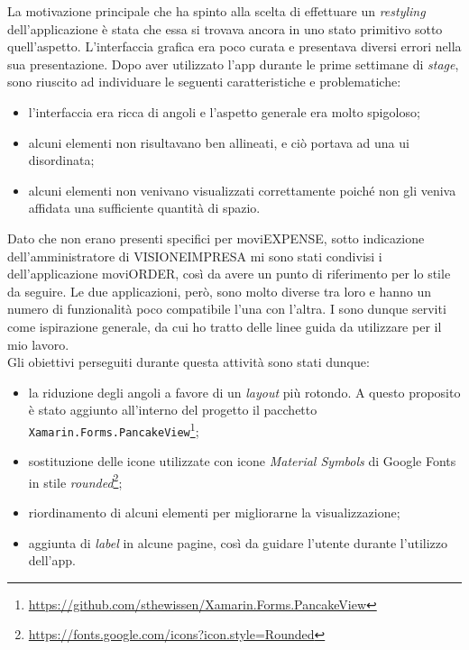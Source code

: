 La motivazione principale che ha spinto alla scelta di effettuare un \textit{restyling} dell'applicazione è stata che essa si trovava ancora in uno stato primitivo sotto quell'aspetto. L'interfaccia grafica era poco curata e presentava diversi errori nella sua presentazione. Dopo aver utilizzato l'app durante le prime settimane di \textit{stage}, sono riuscito ad individuare le seguenti caratteristiche e problematiche:
\begin{itemize}
    \item l'interfaccia era ricca di angoli e l'aspetto generale era molto spigoloso;
    \item alcuni elementi non risultavano ben allineati, e ciò portava ad una \acrshort{ui} disordinata;
    \item alcuni elementi non venivano visualizzati correttamente poiché non gli veniva affidata una sufficiente quantità di spazio.
\end{itemize}

\noindent Dato che non erano presenti  specifici per moviEXPENSE, sotto indicazione dell'amministratore di VISIONEIMPRESA mi sono stati condivisi i  dell'applicazione moviORDER, così da avere un punto di riferimento per lo stile da seguire. Le due applicazioni, però, sono molto diverse tra loro e hanno un numero di funzionalità poco compatibile l'una con l'altra. I  sono dunque serviti come ispirazione generale, da cui ho tratto delle linee guida da utilizzare per il mio lavoro.\\
Gli obiettivi perseguiti durante questa attività sono stati dunque:
\begin{itemize}
    \item la riduzione degli angoli a favore di un \textit{layout} più rotondo. A questo proposito è stato aggiunto all'interno del progetto il pacchetto \texttt{Xamarin.Forms.PancakeView}\footnote{\url{https://github.com/sthewissen/Xamarin.Forms.PancakeView}};
    \item sostituzione delle icone utilizzate con icone \textit{Material Symbols} di Google Fonts in stile \textit{rounded}\footnote{\url{https://fonts.google.com/icons?icon.style=Rounded}};
    \item riordinamento di alcuni elementi per migliorarne la visualizzazione;
    \item aggiunta di \textit{label} in alcune pagine, così da guidare l'utente durante l'utilizzo dell'app.
\end{itemize}

